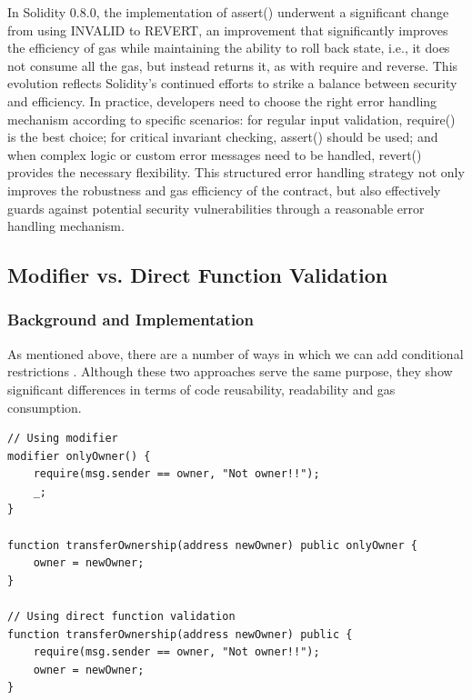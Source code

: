 \documentclass[conference]{IEEEtran}
\begin{document}
In Solidity 0.8.0, the implementation of assert() underwent a significant change from using INVALID to REVERT, an improvement that significantly improves the efficiency of gas while maintaining the ability to roll back state, i.e., it does not consume all the gas, but instead returns it, as with require and reverse. This evolution reflects Solidity's continued efforts to strike a balance between security and efficiency. In practice, developers need to choose the right error handling mechanism according to specific scenarios: for regular input validation, require() is the best choice; for critical invariant checking, assert() should be used; and when complex logic or custom error messages need to be handled, revert() provides the necessary flexibility. This structured error handling strategy not only improves the robustness and gas efficiency of the contract, but also effectively guards against potential security vulnerabilities through a reasonable error handling mechanism.


\vspace{1em}
\subsection{Modifier vs. Direct Function Validation}
\subsubsection{Background and Implementation}

As mentioned above, there are a number of ways in which we can add conditional restrictions \cite{solidityModifiers}. Although these two approaches serve the same purpose, they show significant differences in terms of code reusability, readability and gas consumption.

\begin{lstlisting}[style=solidity]
// Using modifier
modifier onlyOwner() {
    require(msg.sender == owner, "Not owner!!");
    _;
}

function transferOwnership(address newOwner) public onlyOwner {
    owner = newOwner;
}

// Using direct function validation
function transferOwnership(address newOwner) public {
    require(msg.sender == owner, "Not owner!!");
    owner = newOwner;
}
\end{lstlisting}
\end{document}
